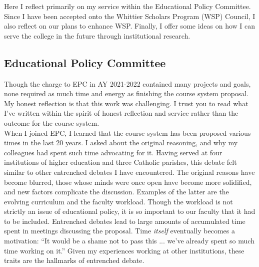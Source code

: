 \documentclass[../../../main.tex]{subfiles}
\begin{document}
\label{sec:committee_service}

Here I reflect primarily on my service within the Educational Policy Committee.  Since I have been accepted onto the Whittier Scholars Program (WSP) Council, I also reflect on our plans to enhance WSP.  Finally, I offer some ideas on how I can serve the college in the future through institutional research.

\subsection{Educational Policy Committee}

Though the charge to EPC in AY 2021-2022 contained many projects and goals, none required as much time and energy as finishing the course system proposal.  My honest reflection is that this work was challenging.  I trust you to read what I've written within the spirit of honest reflection and service rather than the outcome for the course system.
\\
\vspace{0.25cm}
When I joined EPC, I learned that the course system has been proposed various times in the last 20 years.  I asked about the original reasoning, and why my colleagues had spent such time advocating for it.  Having served at four institutions of higher education and three Catholic parishes, this debate felt similar to other entrenched debates I have encountered.  The original reasons have become blurred, those whose minds were once open have become more solidified, and new factors complicate the discussion.  Examples of the latter are the evolving curriculum and the faculty workload.  Though the workload is not strictly an issue of educational policy, it is so important to our faculty that it had to be included.  Entrenched debates lead to large amounts of accumulated time spent in meetings discussing the proposal.  Time \textit{itself} eventually becomes a motivation: ``It would be a shame not to pass this ... we've already spent so much time working on it.''  Given my experiences working at other institutions, these traits are the hallmarks of entrenched debate.
\\
\vspace{0.25cm}
\end{document}

